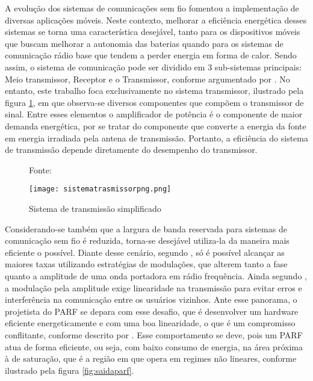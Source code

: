 A evolução dos sistemas de comunicações sem fio fomentou a implementação de diversas aplicações móveis. Neste contexto, melhorar a eficiência energética desses sistemas se torna uma característica desejável, tanto para os dispositivos móveis que buscam melhorar a autonomia das baterias quando para os sistemas de comunicação rádio base que tendem a perder energia em forma de calor.  
Sendo assim, o sistema de comunicação pode ser dividido em 3 sub-sistemas principais: Meio transmissor, Receptor e o Transmissor, conforme argumentado por \cite{Schuartz2017}.
No entanto, este trabalho foca exclusivamente no sistema transmissor, ilustrado pela figura \ref{fig:sistemadetrasmissao}, em que observa-se diversos componentes que compõem o transmissor de sinal. Entre esses elementos o amplificador de potência é o componente de maior demanda energética, por se tratar do componente que converte a energia da fonte em energia irradiada pela antena de transmissão. Portanto, a eficiência do sistema de transmissão depende diretamente do desempenho do transmissor. 

\begin{figure}[!ht!]
    \centering
    \captionsetup{justification=centering}
    \caption*{Fonte: \cite{Schuartz2017}}
    \texttt{[image: sistematrasmissorpng.png]}
    \caption{Sistema de transmissão simplificado}
    \label{fig:sistemadetrasmissao}
\end{figure}

Considerando-se também que a largura de banda reservada para sistemas de comunicação sem fio é reduzida, torna-se desejável utiliza-la da maneira mais eficiente o possível. Diante desse cenário, segundo \cite{Kenington2000}, só é possível alcançar as maiores taxas utilizando estratégias de modulações, que alterem tanto a fase quanto a amplitude de uma onda portadora em rádio frequência. Ainda segundo \cite{Kenington2000}, a modulação pela amplitude exige linearidade na transmissão para evitar erros e interferência na comunicação entre os usuários vizinhos. Ante esse panorama, o projetista do PARF se depara com esse desafio, que é desenvolver um hardware eficiente energeticamente e com uma boa linearidade, o que é um compromisso conflitante, conforme descrito por \cite{Cripps2006}. Esse comportamento se deve, pois um PARF atua de forma eficiente, ou seja, com baixo consumo de energia, na área próxima à de saturação, que é a região em que opera em regimes não lineares, conforme ilustrado pela figura \ref{fig:saidaparf}.



